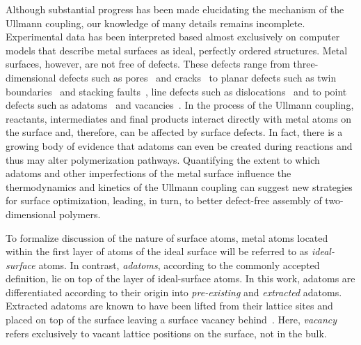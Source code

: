 \documentclass[%
 reprint,
 amsmath,amssymb,
 aps,
prb,
floatfix,
]{revtex4-2}
\newcommand{\lock}{\color{red}}
\newcommand{\lock}{\color{black}}
\begin{document}

{\lock

Although substantial progress has been made elucidating the mechanism of the Ullmann coupling, our knowledge of many details remains incomplete. Experimental data has been interpreted based almost exclusively on computer models that describe metal surfaces as ideal, perfectly ordered structures. 
%
Metal surfaces, however, are not free of defects. These defects range from three-dimensional defects such as pores~\cite{ullmann_72} and cracks~\cite{ullmann_73} to planar defects such as twin boundaries~\cite{ullmann_74} and stacking faults~\cite{ullmann_75}, line defects such as dislocations~\cite{Ullmann_76} and to point defects such as adatoms~\cite{Ullmann_77} and vacancies~\cite{ullmann_78}.
%
In the process of the Ullmann coupling, reactants, intermediates and final products interact directly with metal atoms on the surface and, therefore, can be affected by surface defects. 
In fact, there is a growing body of evidence that adatoms can even be created during reactions and thus may alter polymerization pathways. 
Quantifying the extent to which adatoms and other imperfections of the metal surface influence the thermodynamics and kinetics of the Ullmann coupling can suggest new strategies for surface optimization, leading, in turn, to better defect-free assembly of two-dimensional polymers. 


\ifdefined\INTERNAL
To formalize discussion of the nature of surface atoms, metal atoms located within the first layer of atoms of the ideal surface will be referred to as \emph{ideal-surface} atoms. In contrast, \emph{adatoms}, according to the commonly accepted definition, lie on top of the layer of ideal-surface atoms. In this work, adatoms are differentiated according to their origin into \emph{pre-existing} and \emph{extracted} adatoms. %
Extracted adatoms are known to have been lifted from their lattice sites and placed on top of the surface leaving a surface vacancy behind~\cite{ullmann_96}. Here, \emph{vacancy} refers exclusively to vacant lattice positions on the surface, not in the bulk.
\fi

}
\end{document}
